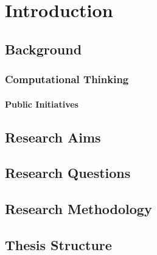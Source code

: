 %
\chapter{Introduction}
\label{sec:intro}

\section{Background}

\subsection{Computational Thinking}

\subsubsection{Public Initiatives}

\section{Research Aims}

\section{Research Questions}

\section{Research Methodology}

\section{Thesis Structure}